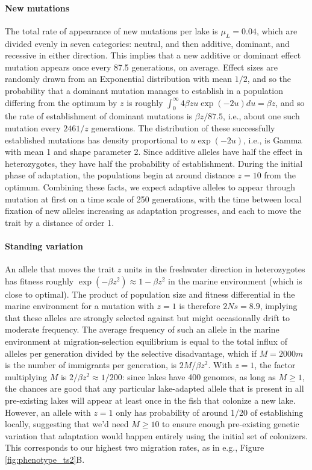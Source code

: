 \documentclass{article}
\begin{document}
\paragraph{New mutations}
The total rate of appearance of new mutations per lake is $\mu_L = 0.04$, which are divided evenly in seven categories: neutral, and then additive, dominant, and recessive in either direction. This implies that a new additive or dominant effect mutation appears once every 87.5 generations, on average. Effect sizes are randomly drawn from an Exponential distribution with mean $1/2$, and so the probability that a dominant mutation manages to establish in a population differing from the optimum by $z$ is roughly $\int_0^\infty 4 \beta z u \exp(-2u) du = \beta z$, and so the rate of establishment of dominant mutations is $\beta z / 87.5$, i.e., about one such mutation every $2461/z$ generations. The distribution of these successfully established mutations  has density proportional to $u \exp(-2u)$, i.e., is Gamma with mean 1 and shape parameter 2. Since additive alleles have half the effect in heterozygotes, they have half the probability of establishment. During the initial phase of adaptation, the populations begin at around distance $z=10$ from the optimum. Combining these facts, we expect adaptive alleles to appear through mutation at first on a time scale of 250 generations, with the time between local fixation of new alleles increasing as adaptation progresses, and each to move the trait by a distance of order 1.

\paragraph{Standing variation}
An allele that moves the trait $z$ units in the freshwater direction in heterozygotes has fitness roughly $\exp(-\beta z^2) \approx 1 - \beta z^2$ in the marine environment (which is close to optimal). The product of population size and fitness differential in the marine environment for a mutation with $z=1$ is therefore $2Ns = 8.9$, implying that these alleles are strongly selected against but might occasionally drift to moderate frequency. The average frequency of such an allele in the marine environment at migration-selection equilibrium is equal to the total influx of alleles per generation divided by the selective disadvantage, which if $M = 2000 m$ is the number of immigrants per generation, is $2 M / \beta z^2$. With $z=1$, the factor multiplying $M$ is $2/\beta z^2 \approx 1/200$: since lakes have 400 genomes, as long as $M \ge 1$, the chances are good that any particular lake-adapted allele that is present in all pre-existing lakes will appear at least once in the fish that colonize a new lake. However, an allele with $z=1$ only has probability of around 1/20 of establishing locally, suggesting that we'd need $M \ge 10$ to ensure enough pre-existing genetic variation that adaptation would happen entirely using the initial set of colonizers. This corresponds to our highest two migration rates, as in e.g., Figure \ref{fig:phenotype_ts2}B.
\end{document}
